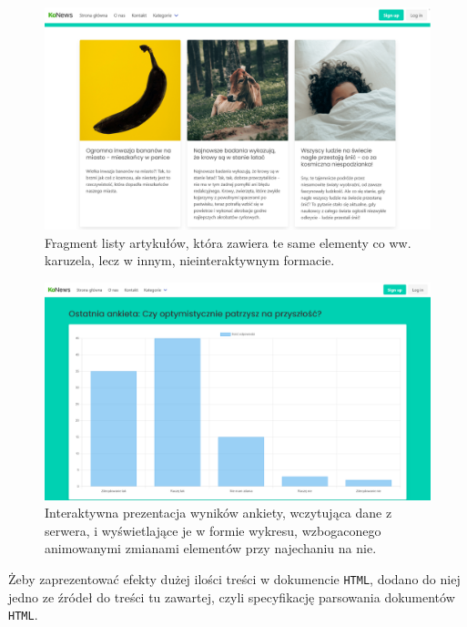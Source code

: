 \documentclass[licencjacka]{pracadypl}
\begin{document}
\begin{figure}[H]
  \centering
  \includegraphics[width=\linewidth/\real{1.1}]{images/frontpage-articles.png}
  \caption{Fragment listy artykułów, która zawiera te same elementy co ww. karuzela, lecz w innym, nieinteraktywnym formacie.}
  \label{fig:frontpage-articles}
\end{figure}

\begin{figure}[H]
  \centering
  \includegraphics[width=\linewidth/\real{1.1}]{images/frontpage-dynamic-article.png}
  \caption{Interaktywna prezentacja wyników ankiety, wczytująca dane z serwera, i wyświetlające je w formie wykresu, wzbogaconego animowanymi zmianami elementów przy najechaniu na nie.}
  \label{fig:frontpage-dynamic}
\end{figure}

Żeby zaprezentować efekty dużej ilości treści w dokumencie \texttt{HTML}, dodano do niej jedno ze źródeł do treści tu zawartej, czyli specyfikację parsowania dokumentów \texttt{HTML}.
\end{document}
